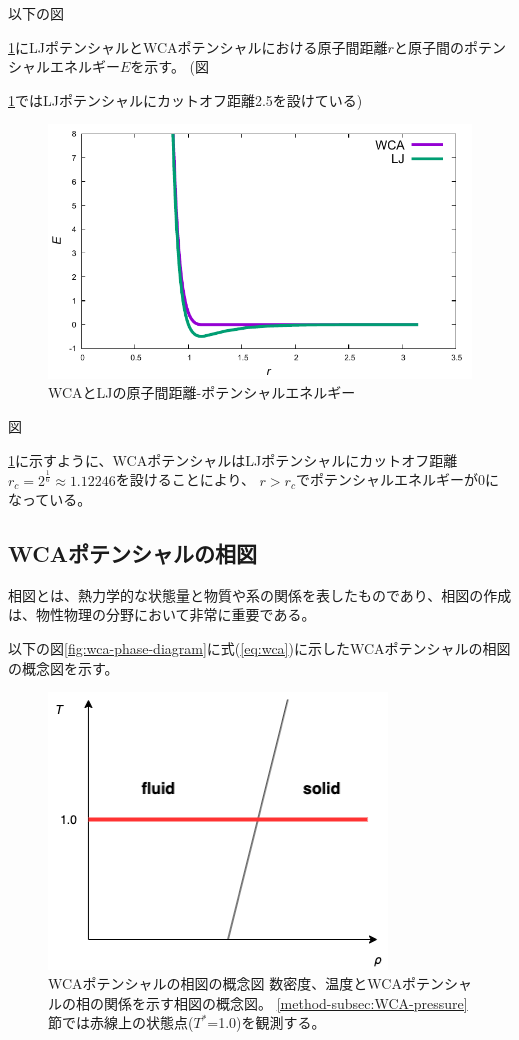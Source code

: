 \documentclass[titlepage]{jsreport}
\begin{document}
以下の図{\ref{fig:dis-poen}にLJポテンシャルとWCAポテンシャルにおける原子間距離$r$と原子間のポテンシャルエネルギー$E$を示す。
(図{\ref{fig:dis-poen}ではLJポテンシャルにカットオフ距離2.5を設けている)

\begin{figure}[htbp]
    \begin{center}
        \includegraphics[width=13cm]{fig/dis-poen.pdf}
    \end{center}
    \caption{WCAとLJの原子間距離-ポテンシャルエネルギー}
    \label{fig:dis-poen}
\end{figure}
図{\ref{fig:dis-poen}に示すように、WCAポテンシャルはLJポテンシャルにカットオフ距離$r_c=2^{\frac{1}{6}}{\approx}1.12246$を設けることにより、
$r>r_c$でポテンシャルエネルギーが0になっている。


\newpage
\subsection{WCAポテンシャルの相図}\label{method-subsec:WCA-phase}
相図とは、熱力学的な状態量と物質や系の関係を表したものであり、相図の作成は、物性物理の分野において非常に重要である\cite{gaussian-phase}。

以下の図\ref{fig:wca-phase-diagram}に式(\ref{eq:wca})に示したWCAポテンシャルの相図の概念図を示す。

\begin{figure}[htbp]
    \begin{center}
        \includegraphics[width=9cm]{fig/wca-phase-diagram.png}
    \end{center}
    \caption{WCAポテンシャルの相図の概念図
    数密度、温度とWCAポテンシャルの相の関係を示す相図の概念図。
    \ref{method-subsec:WCA-pressure}節では赤線上の状態点($T^*$=1.0)を観測する。}
    

\end{figure}}}}
\end{document}
